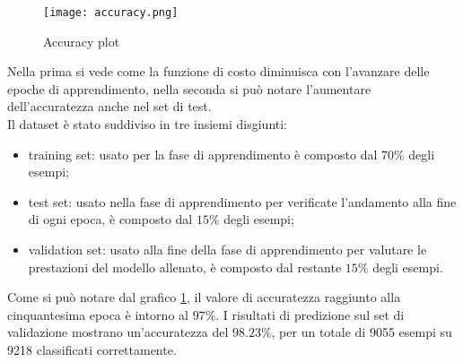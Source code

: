 \begin{figure}
    \centering
    \texttt{[image: accuracy.png]}
    \caption{Accuracy plot}
    \label{accuracy_plot}
\end{figure}
Nella prima si vede come la funzione di costo diminuisca con l'avanzare delle epoche di apprendimento, nella seconda si può notare l'aumentare dell'accuratezza anche nel set di test.\\
Il dataset è stato suddiviso in tre insiemi disgiunti:
\begin{itemize}
    \item training set: usato per la fase di apprendimento è composto dal $70\%$ degli esempi;
    \item test set: usato nella fase di apprendimento per verificate l'andamento alla fine di ogni epoca, è composto dal $15\%$ degli esempi;
    \item validation set: usato alla fine della fase di apprendimento per valutare le prestazioni del modello allenato, è composto dal restante $15\%$ degli esempi.
\end{itemize}
Come si può notare dal grafico \ref*{accuracy_plot}, il valore di accuratezza raggiunto alla cinquantesima epoca è intorno al $97\%$. I risultati di predizione sul set di validazione mostrano un'accuratezza del $98.23\%$, per un totale di 9055 esempi su 9218 classificati correttamente.
